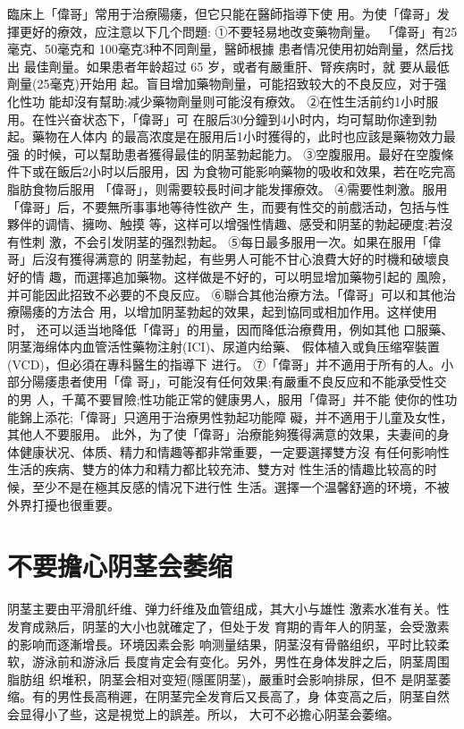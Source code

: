 \documentclass[12pt,UTF8]{ctexbook}
\begin{document}
臨床上「偉哥」常用于治療陽痿，但它只能在醫師指導下使
用。为使「偉哥」发揮更好的療效，应注意以下几个問題:
①不要轻易地改变藥物劑量。
「偉哥」有25毫克、50毫克和
100毫克3种不同劑量，醫師根據
患者情况使用初始劑量，然后找出
最佳劑量。如果患者年龄超过 65
岁，或者有嚴重肝、腎疾病时，就
要从最低劑量(25毫克)开始用
起。盲目增加藥物劑量，可能招致较大的不良反应，对于强化性功
能却沒有幫助;减少藥物劑量则可能沒有療效。
②在性生活前约1小时服用。在性兴奋状态下，「偉哥」可
在服后30分鐘到4小时内，均可幫助你達到勃起。藥物在人体内
的最高浓度是在服用后1小时獲得的，此时也应該是藥物效力最强
的时候，可以幫助患者獲得最佳的阴茎勃起能力。
③空腹服用。最好在空腹條件下或在飯后2小时以后服用，因
为食物可能影响藥物的吸收和效果，若在吃完高脂肪食物后服用
「偉哥」，则需要较長时间才能发揮療效。
④需要性刺激。服用「偉哥」后，不要無所事事地等待性欲产
生，而要有性交的前戲活动，包括与性夥伴的调情、擁吻、触摸
等，这样可以增强性情趣、感受和阴茎的勃起硬度;若沒有性刺
激，不会引发阴茎的强烈勃起。
⑤每日最多服用一次。如果在服用「偉哥」后沒有獲得满意的
阴茎勃起，有些男人可能不甘心浪費大好的时機和破壞良好的情
趣，而選擇追加藥物。这样做是不好的，可以明显增加藥物引起的
風險，并可能因此招致不必要的不良反应。
⑥聯合其他治療方法。「偉哥」可以和其他治療陽痿的方法合
用，以增加阴茎勃起的效果，起到協同或相加作用。这样使用时，
还可以适当地降低「偉哥」的用量，因而降低治療費用，例如其他
口服藥、阴茎海绵体内血管活性藥物注射(ICI)、尿道内给藥、
假体植入或負压缩窄裝置(VCD)，但必須在專科醫生的指導下
进行。
⑦「偉哥」并不適用于所有的人。小部分陽痿患者使用「偉
哥」，可能沒有任何效果;有嚴重不良反应和不能承受性交的男
人，千萬不要冒險;性功能正常的健康男人，服用「偉哥」并不能
使你的性功能錦上添花;「偉哥」只適用于治療男性勃起功能障
礙，并不適用于儿童及女性，其他人不要服用。
此外，为了使「偉哥」治療能夠獲得满意的效果，夫妻间的身
体健康状况、体质、精力和情趣等都非常重要，一定要選擇雙方沒
有任何影响性生活的疾病、雙方的体力和精力都比较充沛、雙方对
性生活的情趣比较高的时候，至少不是在極其反感的情况下进行性
生活。選擇一个温馨舒適的环境，不被外界打擾也很重要。
\section{不要擔心阴茎会萎缩}
阴茎主要由平滑肌纤维、弹力纤维及血管组成，其大小与雄性
激素水准有关。性发育成熟后，阴茎的大小也就確定了，但处于发
育期的青年人的阴茎，会受激素的影响而逐漸增長。环境因素会影
响测量结果，阴茎沒有骨骼组织，平时比较柔软，游泳前和游泳后
長度肯定会有变化。另外，男性在身体发胖之后，阴茎周围脂肪组
织堆积，阴茎会相对变短(隱匿阴茎)，嚴重时会影响排尿，但不
是阴茎萎缩。有的男性長高稍遲，在阴茎完全发育后又長高了，身
体变高之后，阴茎自然会显得小了些，这是視觉上的誤差。所以，
大可不必擔心阴茎会萎缩。
\end{document}
